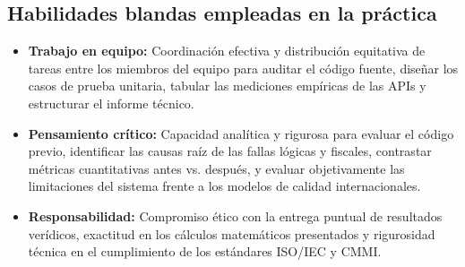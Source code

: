 \documentclass{article}
\begin{document}
\subsection{Habilidades blandas empleadas en la práctica}
\begin{itemize}
    \item[$\boxtimes$] \textbf{Trabajo en equipo:} Coordinación efectiva y distribución equitativa de tareas entre los miembros del equipo para auditar el código fuente, diseñar los casos de prueba unitaria, tabular las mediciones empíricas de las APIs y estructurar el informe técnico.
    \item[$\boxtimes$] \textbf{Pensamiento crítico:} Capacidad analítica y rigurosa para evaluar el código previo, identificar las causas raíz de las fallas lógicas y fiscales, contrastar métricas cuantitativas antes vs. después, y evaluar objetivamente las limitaciones del sistema frente a los modelos de calidad internacionales.
    \item[$\boxtimes$] \textbf{Responsabilidad:} Compromiso ético con la entrega puntual de resultados verídicos, exactitud en los cálculos matemáticos presentados y rigurosidad técnica en el cumplimiento de los estándares ISO/IEC y CMMI.
\end{itemize}
\end{document}
